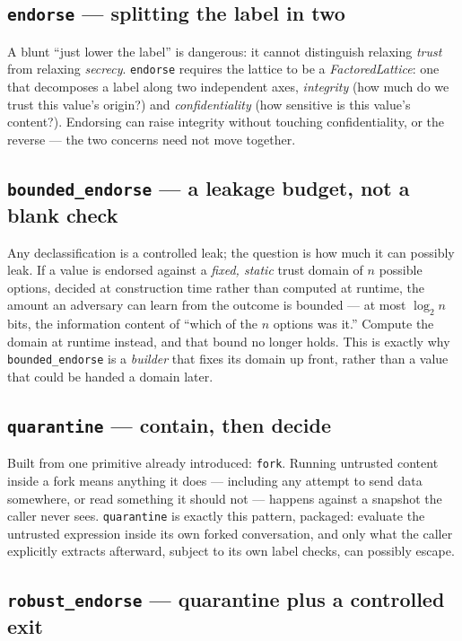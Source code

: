 \documentclass[11pt, a4paper]{article}
\begin{document}
\subsection{\texttt{endorse} --- splitting the label in two}

A blunt ``just lower the label'' is dangerous: it cannot distinguish
relaxing \emph{trust} from relaxing \emph{secrecy}. \lstinline{endorse}
requires the lattice to be a \emph{FactoredLattice}: one that decomposes a
label along two independent axes, \emph{integrity} (how much do we trust
this value's origin?) and \emph{confidentiality} (how sensitive is this
value's content?). Endorsing can raise integrity without touching
confidentiality, or the reverse --- the two concerns need not move
together.

\subsection{\texttt{bounded\_endorse} --- a leakage budget, not a blank check}

Any declassification is a controlled leak; the question is how much it
can possibly leak. If a value is endorsed against a \emph{fixed, static}
trust domain of $n$ possible options, decided at construction time rather
than computed at runtime, the amount an adversary can learn from the
outcome is bounded --- at most $\log_2 n$ bits, the information content of
``which of the $n$ options was it.'' Compute the domain at runtime
instead, and that bound no longer holds. This is exactly why
\lstinline{bounded_endorse} is a \emph{builder} that fixes its domain up
front, rather than a value that could be handed a domain later.

\subsection{\texttt{quarantine} --- contain, then decide}

Built from one primitive already introduced: \lstinline{fork}. Running
untrusted content inside a fork means anything it does --- including any
attempt to send data somewhere, or read something it should not ---
happens against a snapshot the caller never sees. \lstinline{quarantine}
is exactly this pattern, packaged: evaluate the untrusted expression
inside its own forked conversation, and only what the caller explicitly
extracts afterward, subject to its own label checks, can possibly escape.

\subsection{\texttt{robust\_endorse} --- quarantine plus a controlled exit}
\end{document}
